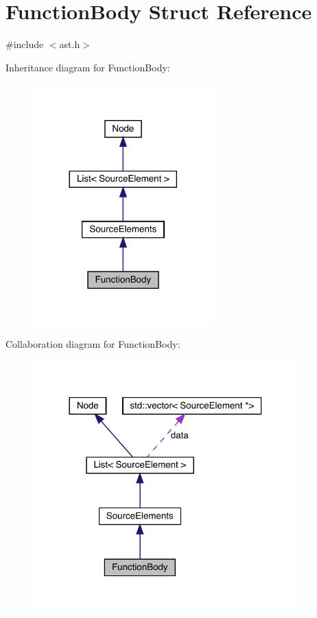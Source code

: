 \hypertarget{struct_function_body}{}\section{Function\+Body Struct Reference}
\label{struct_function_body}


{\ttfamily \#include $<$ast.\+h$>$}



Inheritance diagram for Function\+Body\+:
\nopagebreak
\begin{figure}[H]
\begin{center}
\leavevmode
\includegraphics[width=197pt]{struct_function_body__inherit__graph}
\end{center}
\end{figure}


Collaboration diagram for Function\+Body\+:
\nopagebreak
\begin{figure}[H]
\begin{center}
\leavevmode
\includegraphics[width=290pt]{struct_function_body__coll__graph}
\end{center}
\end{figure}

